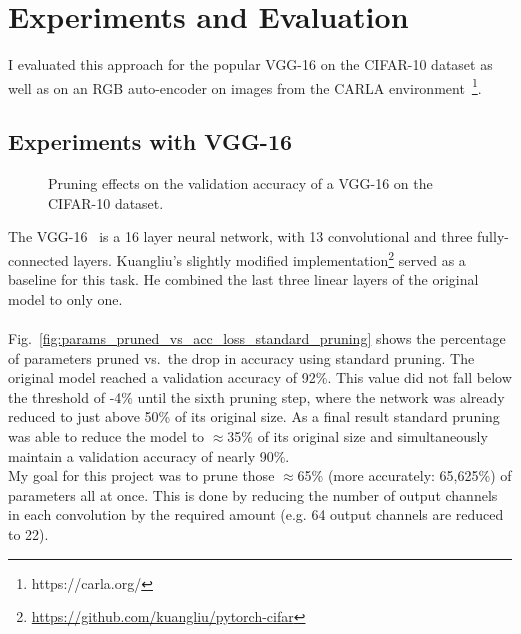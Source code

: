 \documentclass[10pt,twocolumn,letterpaper]{article}
\begin{document}
\section{Experiments and Evaluation}\label{sec:experiments}
I evaluated this approach for the popular VGG-16 on the CIFAR-10 dataset as well as on an RGB auto-encoder on images from the CARLA environment~\footnote{https://carla.org/}.

\subsection{Experiments with VGG-16}
\begin{figure}[hbt]
	\centering
	\caption[]{Pruning effects on the validation accuracy of a VGG-16 on the CIFAR-10 dataset.}
\end{figure}
The VGG-16~\cite{Simonyan2015} is a 16 layer neural network, with 13 convolutional and three fully-connected layers.
Kuangliu's slightly modified implementation\footnote{\url{https://github.com/kuangliu/pytorch-cifar}} served as a baseline for this task.
He combined the last three linear layers of the original model to only one.\\\\
Fig.~\ref{fig:params_pruned_vs_acc_loss_standard_pruning} shows the percentage of parameters pruned vs.\ the drop in accuracy using standard pruning.
The original model reached a validation accuracy of 92\%.
This value did not fall below the threshold of -4\% until the sixth pruning step, where the network was already reduced to just above 50\% of its original size.
As a final result standard pruning was able to reduce the model to $\approx$35\% of its original size and simultaneously maintain a validation accuracy of nearly 90\%.\\
My goal for this project was to prune those $\approx$65\% (more accurately: 65,625\%) of parameters all at once.
This is done by reducing the number of output channels in each convolution by the required amount (e.g. 64 output channels are reduced to 22).
\end{document}

